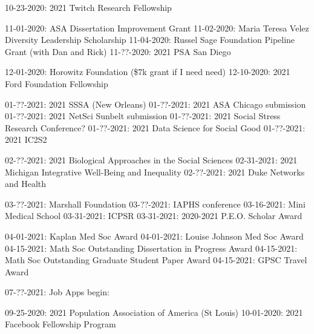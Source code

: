 10-23-2020: 2021 Twitch Research Fellowship    

11-01-2020: ASA Dissertation Improvement Grant 
11-02-2020: Maria Teresa Velez Diversity Leadership Scholarship 
11-04-2020: Russel Sage Foundation Pipeline Grant (with Dan and Rick)
11-??-2020: 2021 PSA San Diego

12-01-2020: Horowitz Foundation (\$7k grant if I need need)
12-10-2020: 2021 Ford Foundation Fellowship 

01-??-2021: 2021 SSSA (New Orleans)
01-??-2021: 2021 ASA Chicago submission
01-??-2021: 2021 NetSci Sunbelt submission
01-??-2021: 2021 Social Stress Research Conference? 
01-??-2021: 2021 Data Science for Social Good
01-??-2021: 2021 IC2S2

02-??-2021: 2021 Biological Approaches in the Social Sciences 
02-31-2021: 2021 Michigan Integrative Well-Being and Inequality 
02-??-2021: 2021 Duke Networks and Health

03-??-2021: Marshall Foundation
03-??-2021: IAPHS conference 
03-16-2021: Mini Medical School
03-31-2021: ICPSR
03-31-2021: 2020-2021 P.E.O. Scholar Award 

04-01-2021: Kaplan Med Soc Award
04-01-2021: Louise Johnson Med Soc Award
04-15-2021: Math Soc Outstanding Dissertation in Progress Award
04-15-2021: Math Soc Outstanding Graduate Student Paper Award
04-15-2021: GPSC Travel Award

07-??-2021: Job Apps begin:


09-25-2020: 2021 Population Association of America (St Louis)
10-01-2020: 2021 Facebook Fellowship Program
